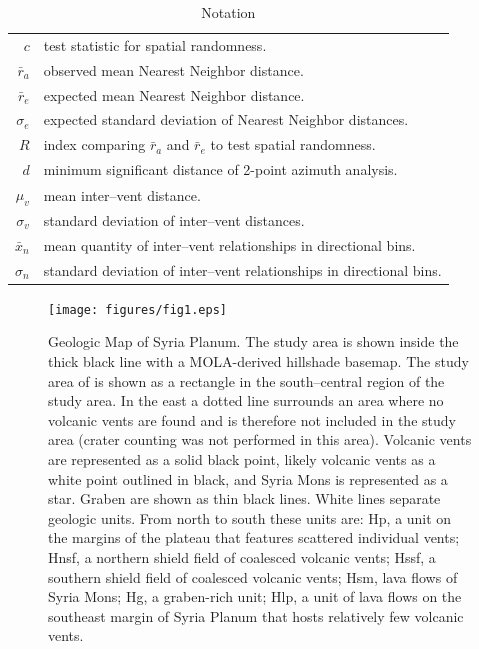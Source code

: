 \begin{table}[h]
\caption{Notation}
\centering
\begin{tabular}{r p{7cm}}
\hline
  $c$&test statistic for spatial randomness.\\
  $\bar{r}_a$&observed mean Nearest Neighbor distance.\\
  $\bar{r}_e$&expected mean Nearest Neighbor distance.\\
  $\sigma_e$&expected standard deviation of Nearest Neighbor distances.\\
  $R$&index comparing $\bar{r}_a$ and $\bar{r}_e$ to test spatial randomness.\\
  $d$&minimum significant distance of 2-point azimuth analysis.\\
  $\mu_v$&mean inter--vent distance.\\
  $\sigma_v$&standard deviation of inter--vent distances.\\
  $\bar{x}_n$&mean quantity of inter--vent relationships in directional bins.\\
  $\sigma_n$&standard deviation of inter--vent relationships in directional bins.\\
\hline
\end{tabular}
\label{tab-notation}
\end{table}


\begin{figure}
\noindent\texttt{[image: figures/fig1.eps]}
\caption{Geologic Map of Syria Planum. The study area is shown inside the thick black line with a MOLA-derived hillshade basemap. The study area of \citet{Baptista2008} is shown as a rectangle in the south--central region of the study area. In the east a dotted line surrounds an area where no volcanic vents are found and is therefore not included in the study area (crater counting was not performed in this area). Volcanic vents are represented as a solid black point, likely volcanic vents as a white point outlined in black, and Syria Mons is represented as a star. Graben are shown as thin black lines. White lines separate geologic units. From north to south these units are: Hp, a unit on the margins of the plateau that features scattered individual vents; Hnsf, a northern shield field of coalesced volcanic vents; Hssf, a southern shield field of coalesced volcanic vents; Hsm, lava flows of Syria Mons; Hg, a graben-rich unit; Hlp, a unit of lava flows on the southeast margin of Syria Planum that hosts relatively few volcanic vents.}
\label{fig-geomap}
\end{figure}

